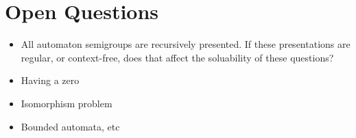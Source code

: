 \documentclass[11pt, titlepage]{article}
\begin{document}
\section{Open Questions}

\begin{itemize}
\item All automaton semigroups are recursively presented. If these
  presentations are regular, or context-free, does that affect the
  soluability of these questions?
\item Having a zero
\item Isomorphism problem
\item Bounded automata, etc
\end{itemize}

\nocite{*}

\end{document}
